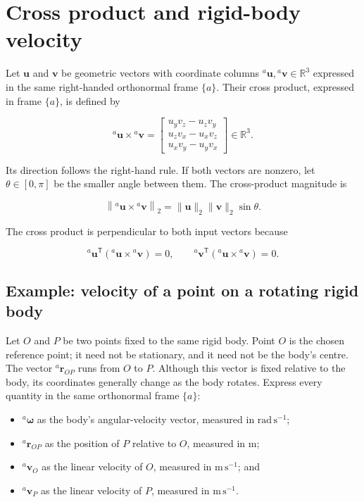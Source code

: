 \documentclass[
  australian,
  12pt,
  letterpaper,
  DIV=11,
  numbers=noendperiod,
  twoside]{scrreprt}
\providecommand{\tightlist}{%
  \setlength{\itemsep}{0pt}\setlength{\parskip}{0pt}}
\begin{document}
\section{Cross product and rigid-body
velocity}\label{cross-product-and-rigid-body-velocity}

Let \(\mathbf u\) and \(\mathbf v\) be geometric vectors with coordinate
columns \({}^{a}\mathbf u,{}^{a}\mathbf v\in\mathbb R^3\) expressed in
the same right-handed orthonormal frame \(\{a\}\). Their cross product,
expressed in frame \(\{a\}\), is defined by

\[
{}^{a}\mathbf{u}\times{}^{a}\mathbf{v}
=
\begin{bmatrix}
u_yv_z-u_zv_y \\
u_zv_x-u_xv_z \\
u_xv_y-u_yv_x
\end{bmatrix}
\in\mathbb R^3.
\]

Its direction follows the right-hand rule. If both vectors are nonzero,
let \(\theta\in[0,\pi]\) be the smaller angle between them. The
cross-product magnitude is

\[
\left\|{}^{a}\mathbf{u}\times{}^{a}\mathbf{v}\right\|_2
=
\|\mathbf{u}\|_2\|\mathbf{v}\|_2\sin\theta.
\]

The cross product is perpendicular to both input vectors because

\[
{}^{a}\mathbf{u}^\mathsf{T}
\left({}^{a}\mathbf{u}\times{}^{a}\mathbf{v}\right)=0,
\qquad
{}^{a}\mathbf{v}^\mathsf{T}
\left({}^{a}\mathbf{u}\times{}^{a}\mathbf{v}\right)=0.
\]

\subsection{Example: velocity of a point on a rotating rigid
body}\label{example-velocity-of-a-point-on-a-rotating-rigid-body}

Let \(O\) and \(P\) be two points fixed to the same rigid body. Point
\(O\) is the chosen reference point; it need not be stationary, and it
need not be the body's centre. The vector \({}^{a}\mathbf{r}_{OP}\) runs
from \(O\) to \(P\). Although this vector is fixed relative to the body,
its coordinates generally change as the body rotates. Express every
quantity in the same orthonormal frame \(\{a\}\):

\begin{itemize}
\tightlist
\item
  \({}^{a}\boldsymbol{\omega}\) as the body's angular-velocity vector,
  measured in \(\mathrm{rad\,s^{-1}}\);
\item
  \({}^{a}\mathbf{r}_{OP}\) as the position of \(P\) relative to \(O\),
  measured in \(\mathrm{m}\);
\item
  \({}^{a}\mathbf{v}_O\) as the linear velocity of \(O\), measured in
  \(\mathrm{m\,s^{-1}}\); and
\item
  \({}^{a}\mathbf{v}_P\) as the linear velocity of \(P\), measured in
  \(\mathrm{m\,s^{-1}}\).
\end{itemize}
\end{document}
